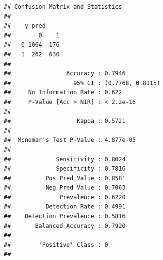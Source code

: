 \documentclass[
]{article}
\begin{document}
\begin{verbatim}
## Confusion Matrix and Statistics
## 
##    y_pred
##        0    1
##   0 1064  176
##   1  262  630
##                                           
##                Accuracy : 0.7946          
##                  95% CI : (0.7768, 0.8115)
##     No Information Rate : 0.622           
##     P-Value [Acc > NIR] : < 2.2e-16       
##                                           
##                   Kappa : 0.5721          
##                                           
##  Mcnemar's Test P-Value : 4.877e-05       
##                                           
##             Sensitivity : 0.8024          
##             Specificity : 0.7816          
##          Pos Pred Value : 0.8581          
##          Neg Pred Value : 0.7063          
##              Prevalence : 0.6220          
##          Detection Rate : 0.4991          
##    Detection Prevalence : 0.5816          
##       Balanced Accuracy : 0.7920          
##                                           
##        'Positive' Class : 0               
## 
\end{verbatim}
\end{document}
